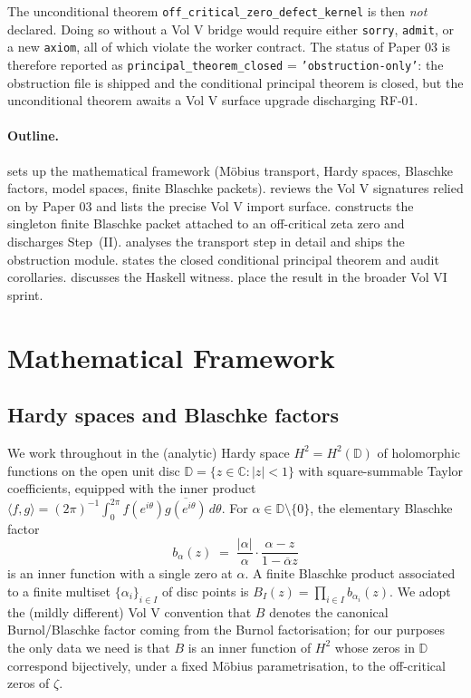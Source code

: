 \documentclass[12pt]{article}
\theoremstyle{definition}
\theoremstyle{remark}
\newcommand{\C}{\mathbb{C}}
\newcommand{\Disc}{\mathbb{D}}
\newcommand{\HardyTwo}{H^{2}}
\newcommand{\BurnolFactor}{B}
\begin{document}
The unconditional theorem
\texttt{off\_critical\_zero\_defect\_kernel} is then \emph{not} declared.
Doing so without a Vol V bridge would require either \texttt{sorry},
\texttt{admit}, or a new \texttt{axiom}, all of which violate the worker
contract. The status of Paper 03 is therefore reported as
\texttt{principal\_theorem\_closed} = \texttt{'obstruction-only'}: the
obstruction file is shipped and the conditional principal theorem is
closed, but the unconditional theorem awaits a Vol V surface upgrade
discharging RF-01.

\paragraph{Outline.}  sets up the mathematical
framework (Möbius transport, Hardy spaces, Blaschke factors, model
spaces, finite Blaschke packets).  reviews the
Vol V signatures relied on by Paper 03 and lists the precise Vol V
import surface.  constructs the
singleton finite Blaschke packet attached to an off-critical zeta zero
and discharges Step~(II).  analyses
the transport step in detail and ships the obstruction module.
 states the closed conditional principal theorem and
audit corollaries.  discusses the Haskell witness.
 place the result in the broader
Vol VI sprint.

\section{Mathematical Framework}\label{sec:framework}

\subsection{Hardy spaces and Blaschke factors}

We work throughout in the (analytic) Hardy space
\(
\HardyTwo = \HardyTwo(\Disc)
\)
of holomorphic functions on the open unit disc $\Disc = \{z\in\C : |z|<1\}$
with square-summable Taylor coefficients, equipped with the inner product
$\langle f, g\rangle = (2\pi)^{-1}\int_{0}^{2\pi}
f(e^{i\theta})\overline{g(e^{i\theta})}\,d\theta$. For
$\alpha\in\Disc\setminus\{0\}$, the elementary Blaschke factor
\begin{equation}
b_{\alpha}(z) \;=\; \frac{|\alpha|}{\alpha}\cdot\frac{\alpha-z}{1-\overline{\alpha}z}
\end{equation}
is an inner function with a single zero at $\alpha$. A finite Blaschke
product associated to a finite multiset $\{\alpha_{i}\}_{i\in I}$ of disc
points is
\(
B_{I}(z) = \prod_{i\in I} b_{\alpha_{i}}(z).
\)
We adopt the (mildly different) Vol V convention that $\BurnolFactor$
denotes the canonical Burnol/Blaschke factor coming from the Burnol
factorisation; for our purposes the only data we need is that
$\BurnolFactor$ is an inner function of $\HardyTwo$ whose zeros in $\Disc$
correspond bijectively, under a fixed Möbius parametrisation, to the
off-critical zeros of $\zeta$.
\end{document}
